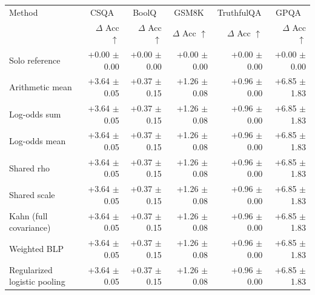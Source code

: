 \begin{tabular}{lrrrrr}
\toprule
Method & \multicolumn{1}{c}{CSQA} & \multicolumn{1}{c}{BoolQ} & \multicolumn{1}{c}{GSM8K} & \multicolumn{1}{c}{TruthfulQA} & \multicolumn{1}{c}{GPQA} \\
 & $\Delta$ Acc $\uparrow$ & $\Delta$ Acc $\uparrow$ & $\Delta$ Acc $\uparrow$ & $\Delta$ Acc $\uparrow$ & $\Delta$ Acc $\uparrow$ \\
\midrule
Solo reference & +0.00 {\scriptsize $\pm$ 0.00} & +0.00 {\scriptsize $\pm$ 0.00} & +0.00 {\scriptsize $\pm$ 0.00} & +0.00 {\scriptsize $\pm$ 0.00} & +0.00 {\scriptsize $\pm$ 0.00} \\
Arithmetic mean & +3.64 {\scriptsize $\pm$ 0.05} & +0.37 {\scriptsize $\pm$ 0.15} & +1.26 {\scriptsize $\pm$ 0.08} & +0.96 {\scriptsize $\pm$ 0.00} & +6.85 {\scriptsize $\pm$ 1.83} \\
Log-odds sum & +3.64 {\scriptsize $\pm$ 0.05} & +0.37 {\scriptsize $\pm$ 0.15} & +1.26 {\scriptsize $\pm$ 0.08} & +0.96 {\scriptsize $\pm$ 0.00} & +6.85 {\scriptsize $\pm$ 1.83} \\
Log-odds mean & +3.64 {\scriptsize $\pm$ 0.05} & +0.37 {\scriptsize $\pm$ 0.15} & +1.26 {\scriptsize $\pm$ 0.08} & +0.96 {\scriptsize $\pm$ 0.00} & +6.85 {\scriptsize $\pm$ 1.83} \\
Shared rho & +3.64 {\scriptsize $\pm$ 0.05} & +0.37 {\scriptsize $\pm$ 0.15} & +1.26 {\scriptsize $\pm$ 0.08} & +0.96 {\scriptsize $\pm$ 0.00} & +6.85 {\scriptsize $\pm$ 1.83} \\
Shared scale & +3.64 {\scriptsize $\pm$ 0.05} & +0.37 {\scriptsize $\pm$ 0.15} & +1.26 {\scriptsize $\pm$ 0.08} & +0.96 {\scriptsize $\pm$ 0.00} & +6.85 {\scriptsize $\pm$ 1.83} \\
Kahn (full covariance) & +3.64 {\scriptsize $\pm$ 0.05} & +0.37 {\scriptsize $\pm$ 0.15} & +1.26 {\scriptsize $\pm$ 0.08} & +0.96 {\scriptsize $\pm$ 0.00} & +6.85 {\scriptsize $\pm$ 1.83} \\
Weighted BLP & +3.64 {\scriptsize $\pm$ 0.05} & +0.37 {\scriptsize $\pm$ 0.15} & +1.26 {\scriptsize $\pm$ 0.08} & +0.96 {\scriptsize $\pm$ 0.00} & +6.85 {\scriptsize $\pm$ 1.83} \\
Regularized logistic pooling & +3.64 {\scriptsize $\pm$ 0.05} & +0.37 {\scriptsize $\pm$ 0.15} & +1.26 {\scriptsize $\pm$ 0.08} & +0.96 {\scriptsize $\pm$ 0.00} & +6.85 {\scriptsize $\pm$ 1.83} \\

\end{tabular}

